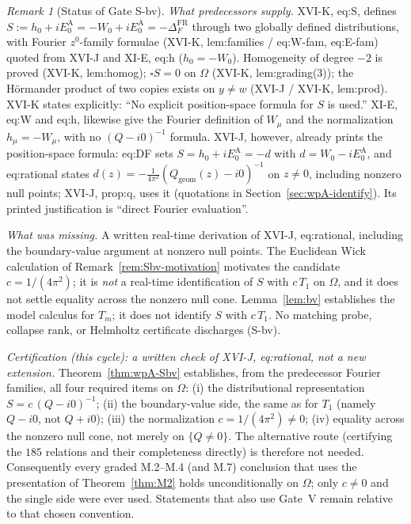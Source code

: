\documentclass{article}
\theoremstyle{remark}
\newtheorem{remark}[proposition]{Remark}
\begin{document}
\begin{remark}[Status of Gate S-bv]
\label{rem:Sbv-status}
\emph{What predecessors supply.} XVI-K, eq:S, defines $S:=h_0+iE_0^{\mathrm A}=-W_0+iE_0^{\mathrm A}=-\Delta_F^{\mathrm{FR}}$ through two globally defined distributions, with Fourier $z^0$-family formulae (XVI-K, lem:families / eq:W-fam, eq:E-fam) quoted from XVI-J and XI-E, eq:h ($h_0=-W_0$).
Homogeneity of degree $-2$ is proved (XVI-K, lem:homog); $\square S=0$ on $\Omega$ (XVI-K, lem:grading(3)); the H\"ormander product of two copies exists on $y\neq w$ (XVI-J / XVI-K, lem:prod).
XVI-K states explicitly: ``No explicit position-space formula for \(S\) is used.''
XI-E, eq:W and eq:h, likewise give the Fourier definition of $W_\mu$ and the normalization $h_\mu=-W_\mu$, with no $(Q-i0)^{-1}$ formula.
XVI-J, however, already prints the position-space formula: eq:DF sets $S=h_0+iE_0^{\mathrm A}=-d$ with $d=W_0-iE_0^{\mathrm A}$, and eq:rational states $d(z)=-\frac1{4\pi^2}(Q_{\mathrm{geom}}(z)-i0)^{-1}$ on $z\neq0$, including nonzero null points; XVI-J, prop:q, uses it (quotations in Section~\ref{sec:wpA-identify}).
Its printed justification is ``direct Fourier evaluation''.

\emph{What was missing.} A written real-time derivation of XVI-J, eq:rational, including the boundary-value argument at nonzero null points. The Euclidean Wick calculation of Remark~\ref{rem:Sbv-motivation} motivates the candidate $c=1/(4\pi^2)$; it is \emph{not} a real-time identification of $S$ with $c\,T_1$ on $\Omega$, and it does not settle equality across the nonzero null cone.
Lemma~\ref{lem:bv} establishes the model calculus for $T_m$; it does not identify $S$ with $c\,T_1$.
No matching probe, collapse rank, or Helmholtz certificate discharges (S-bv).

\emph{Certification (this cycle): a written check of XVI-J, eq:rational, not a new extension.} Theorem~\ref{thm:wpA-Sbv} establishes, from the predecessor Fourier families, all four required items on $\Omega$: (i) the distributional representation $S=c\,(Q-i0)^{-1}$; (ii) the boundary-value side, the same as for $T_1$ (namely $Q-i0$, not $Q+i0$); (iii) the normalization $c=1/(4\pi^2)\neq0$; (iv) equality across the nonzero null cone, not merely on $\{Q\neq0\}$.
The alternative route (certifying the $185$ relations and their completeness directly) is therefore not needed.
Consequently every graded M.2--M.4 (and M.7) conclusion that uses the presentation of Theorem~\ref{thm:M2} holds unconditionally on $\Omega$; only $c\neq0$ and the single side were ever used.
Statements that also use Gate~V remain relative to that chosen convention.
\end{remark}
\end{document}

